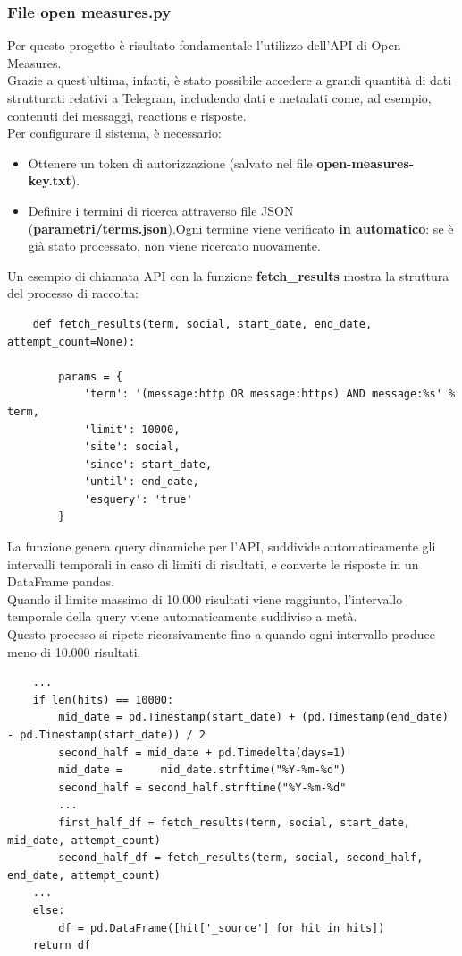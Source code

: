 \documentclass[12pt]{article}
\begin{document}
	\subsubsection{File open measures.py}
	Per questo progetto è risultato fondamentale l'utilizzo dell'API di Open Measures.\\
	Grazie a quest'ultima, infatti, è stato possibile accedere a grandi quantità di dati strutturati relativi a Telegram, includendo dati e metadati come, ad esempio, contenuti dei messaggi, reactions e risposte.\\
	Per configurare il sistema, è necessario:
	\begin{itemize}[label=] 
		\item Ottenere un token di autorizzazione (salvato nel file \textbf{open-measures-key.txt}).
		\item Definire i termini di ricerca attraverso file JSON (\textbf{parametri/terms.json}).Ogni termine viene verificato \textbf{in automatico}: se è già stato processato, non viene ricercato nuovamente.
	\end{itemize}
	Un esempio di chiamata API con la funzione \textbf{fetch\_results} mostra la struttura del processo di raccolta:
	\begin{lstlisting}
	def fetch_results(term, social, start_date, end_date, attempt_count=None):
		
		params = {
			'term': '(message:http OR message:https) AND message:%s' % term,
			'limit': 10000,
			'site': social,
			'since': start_date,
			'until': end_date,
			'esquery': 'true'
		}
	\end{lstlisting}
	La funzione genera query dinamiche per l’API, suddivide automaticamente gli intervalli temporali in caso di limiti di risultati, e converte le risposte in un DataFrame pandas.\\
	Quando il limite massimo di 10.000 risultati viene raggiunto, l'intervallo temporale della query viene automaticamente suddiviso a metà.\\ Questo processo si ripete ricorsivamente fino a quando ogni intervallo produce meno di 10.000 risultati.
	\begin{lstlisting}
	...
	if len(hits) == 10000:
		mid_date = pd.Timestamp(start_date) + (pd.Timestamp(end_date) - pd.Timestamp(start_date)) / 2
		second_half = mid_date + pd.Timedelta(days=1)
		mid_date = 		mid_date.strftime("%Y-%m-%d")
		second_half = second_half.strftime("%Y-%m-%d"
		...
		first_half_df = fetch_results(term, social, start_date, mid_date, attempt_count)
		second_half_df = fetch_results(term, social, second_half, end_date, attempt_count)
	...
	else:
		df = pd.DataFrame([hit['_source'] for hit in hits])
	return df
	\end{lstlisting}
\end{document}

